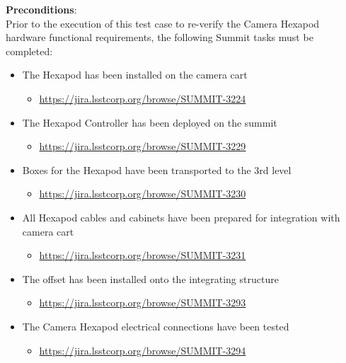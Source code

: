 \documentclass[SE,lsstdraft,STR,toc]{lsstdoc}
\providecommand{\tightlist}{
  \setlength{\itemsep}{0pt}\setlength{\parskip}{0pt}}
\begin{document}
\textbf{ Preconditions}:\\
Prior to the execution of this test case to re-verify the Camera Hexapod
hardware functional requirements, the following Summit tasks must be
completed:

\begin{itemize}
\tightlist
\item
  The Hexapod has been installed on the camera cart

  \begin{itemize}
  \tightlist
  \item
    \url{https://jira.lsstcorp.org/browse/SUMMIT-3224}
  \end{itemize}
\item
  The Hexapod Controller has been deployed on the summit

  \begin{itemize}
  \tightlist
  \item
    \url{https://jira.lsstcorp.org/browse/SUMMIT-3229}
  \end{itemize}
\item
  Boxes for the Hexapod have been transported to the 3rd level

  \begin{itemize}
  \tightlist
  \item
    \url{https://jira.lsstcorp.org/browse/SUMMIT-3230}
  \end{itemize}
\item
  All Hexapod cables and cabinets have been prepared for integration
  with camera cart

  \begin{itemize}
  \tightlist
  \item
    \url{https://jira.lsstcorp.org/browse/SUMMIT-3231}
  \end{itemize}
\item
  The offset has been installed onto the integrating structure

  \begin{itemize}
  \tightlist
  \item
    \url{https://jira.lsstcorp.org/browse/SUMMIT-3293}
  \end{itemize}
\item
  The Camera Hexapod electrical connections have been tested

  \begin{itemize}
  \tightlist
  \item
    \url{https://jira.lsstcorp.org/browse/SUMMIT-3294}
  \end{itemize}
\end{itemize}
\end{document}
